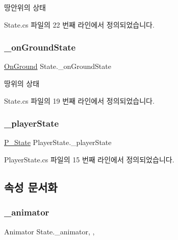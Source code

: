 땅안위의 상태 



State.\+cs 파일의 22 번째 라인에서 정의되었습니다.

\mbox{\label{class_state_ab3170df5e58f541f39edff3c1278d443}} 
\subsubsection{\texorpdfstring{\_onGroundState}{\_onGroundState}}
{\footnotesize\ttfamily \mbox{\hyperlink{class_state_ab9eb1c1d81f1903b8486d1275e78b68e}{On\+Ground}} State.\+\_\+on\+Ground\+State\hspace{0.3cm}{\ttfamily [inherited]}}



땅위의 상태 



State.\+cs 파일의 19 번째 라인에서 정의되었습니다.

\mbox{\label{class_player_state_a9492a14c13c0dc523c37cb44d334ab68}} 
\subsubsection{\texorpdfstring{\_playerState}{\_playerState}}
{\footnotesize\ttfamily \mbox{\hyperlink{class_player_state_afe68f1a1529955d173ccd309da55001b}{P\+\_\+\+State}} Player\+State.\+\_\+player\+State}



Player\+State.\+cs 파일의 15 번째 라인에서 정의되었습니다.



\subsection{속성 문서화}
\mbox{\label{class_state_aff1dd03a1b3c63053b23371d6d70cd1a}} 
\subsubsection{\texorpdfstring{\_animator}{\_animator}}
{\footnotesize\ttfamily Animator State.\+\_\+animator\hspace{0.3cm}{\ttfamily [get]}, {\ttfamily [set]}, {\ttfamily [inherited]}}




